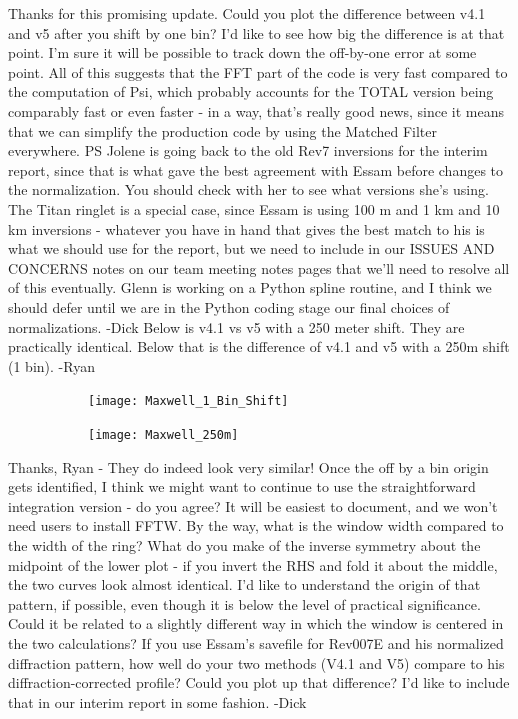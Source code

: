 \documentclass[crop=false,class=article,oneside]{standalone}
\begin{document}
Thanks for this promising update. Could you plot the difference between v4.1 and v5 after you shift by one bin? I'd like to see how big the difference is at that point. I'm sure it will be possible to track down the off-by-one error at some point. 
All of this suggests that the FFT part of the code is very fast compared to the computation of Psi, which probably accounts for the TOTAL version being comparably fast or even faster - in a way, that's really good news, since it means that we can simplify the production code by using the Matched Filter everywhere. PS Jolene is going back to the old Rev7 inversions for the interim report, since that is what gave the best agreement with Essam before changes to the normalization. You should check with her to see what versions she's using. The Titan ringlet is a special case, since Essam is using 100 m and 1 km  and 10 km inversions - whatever you have in hand that gives the best match to his is what we should use for the report, but we need to include in our ISSUES AND CONCERNS notes on our team meeting notes pages that we'll need to resolve all of this eventually. Glenn is working on a Python spline routine, and I think we should defer until we are in the Python coding stage our final choices of normalizations. -Dick
Below is v4.1 vs v5 with a 250 meter shift. They are practically identical. Below that is the difference of v4.1 and v5 with a 250m shift (1 bin). -Ryan
\begin{figure}[H]
    \centering
    \begin{subfigure}[b]{0.49\textwidth}
        \texttt{[image: Maxwell\_1\_Bin\_Shift]}
    \end{subfigure}
        \begin{subfigure}[b]{0.49\textwidth}
        \texttt{[image: Maxwell\_250m]}
    \end{subfigure}
\end{figure}
Thanks, Ryan - They do indeed look very similar! Once the off by a bin origin gets identified, I think we might want to continue to use the straightforward integration version - do you agree? It will be easiest to document, and we won't need users to install FFTW. By the way, what is the window width compared to the width of the ring? What do you make of the inverse symmetry about the midpoint of the lower plot - if you invert the RHS and fold it about the middle, the two curves look almost identical. I'd like to understand the origin of that pattern, if possible, even though it is below the level of practical significance. Could it be related to a slightly different way in which the window is centered in the two calculations? If you use Essam's savefile for Rev007E and his normalized diffraction pattern, how well do your two methods (V4.1 and V5) compare to his diffraction-corrected profile? Could you plot up that difference? I'd like to include that in our interim report in some fashion. -Dick\\
\end{document}
